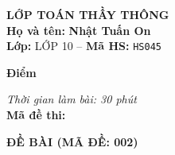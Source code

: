 \noindent
\begin{tcolorbox}[colback=white,colframe=black,arc=0mm,boxrule=0.8pt,top=4pt,bottom=4pt,left=6pt,right=6pt]
	\begin{minipage}[c]{0.44\textwidth}
		{\bfseries\large LỚP TOÁN THẦY THÔNG}\\[3pt]
		\textbf{Họ và tên:} \textbf{\large Nhật Tuấn On}\\[3pt]
		\textbf{Lớp:} LỚP 10 \quad -- \quad \textbf{Mã HS:} \texttt{HS045}
	\end{minipage}
	\hfill
	\begin{minipage}[c]{0.22\textwidth}
		\begin{tcolorbox}[colback=white,colframe=black,arc=0mm,boxrule=0.6pt,height=1.8cm,halign=center,valign=top,top=2pt]
			{\bfseries\normalsize Điểm}
		\end{tcolorbox}
	\end{minipage}
	\hfill
	\begin{minipage}[c]{0.30\textwidth}
		\raggedleft
		\textit{Thời gian làm bài: 30 phút}\\[4pt]
		\textbf{Mã đề thi:} 
	\end{minipage}
\end{tcolorbox}
\vspace{0.25cm}

\noindent\textbf{\large ĐỀ BÀI (MÃ ĐỀ: 002)}
\vspace{0.1cm}

